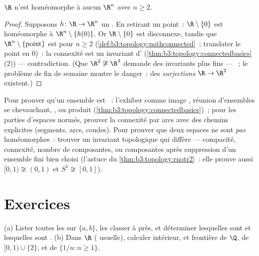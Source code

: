 \begin{theorem}\label{thm:b3:topology:rnotr2}
$\R$ n'est homéomorphe à aucun $\R^n$ avec $n \geq 2$.
\end{theorem}

\begin{proof}
Supposons $h \colon \R \to \R^n$ un . En
retirant un point~: $\R \setminus \{0\}$ est homéomorphe à
$\R^n \setminus \{h(0)\}$. Or $\R\setminus\{0\}$ est
disconnexe, tandis que $\R^n\setminus\{\text{point}\}$ est
 pour $n \geq 2$
(\cref{def:b3:topology:pathconnected}~; translater le point en
$0$)~: la connexité est un invariant d'
(\cref{thm:b3:topology:connectedbasics}(2)) --- contradiction.
(Que $\R^2 \not\cong \R^3$ demande des invariants plus fins ---
 ~; le problème de fin de semaine montre le
danger~: des \emph{surjections } $\R \to \R^2$
existent.)
\end{proof}

\begin{method}\label{met:b3:topology:connectargument}
Pour prouver qu'un ensemble est ~: l'exhiber comme image
, réunion d'ensembles  se chevauchant,
, ou produit
(\cref{thm:b3:topology:connectedbasics})~; pour les parties
d'espaces normés, prouver la connexité par arcs avec des
chemins explicites (segments, arcs, coudes). Pour prouver que
deux espaces ne sont \emph{pas} homéomorphes~: trouver un
invariant topologique qui diffère --- compacité, connexité,
nombre de composantes, ou composantes après suppression d'un
ensemble fini bien choisi (l'astuce du
\cref{thm:b3:topology:rnotr2}~: elle prouve aussi $[0,1)
\not\cong (0,1)$ et $S^1 \not\cong [0,1]$).
\end{method}

\section{Exercices}

\begin{exercise}[$\star$]\label{exo:b3:topology:1}
(a) Lister toutes les  sur $\{a, b\}$, les classer à
 près, et déterminer lesquelles sont  et
lesquelles sont .
(b) Dans $\R$ ( usuelle), calculer intérieur,
 et frontière de $\Q$, de $[0,1) \cup \{2\}$, et de
$\{1/n : n \geq 1\}$.
\end{exercise}

